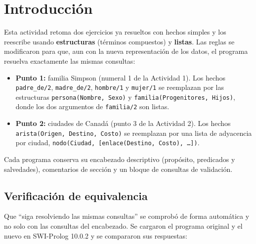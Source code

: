 \documentclass[12pt]{report}
\begin{document}

\tableofcontents
\newpage


\chapter{Introducción}

Esta actividad retoma dos ejercicios ya resueltos con hechos simples y los
reescribe usando \textbf{estructuras} (términos compuestos) y
\textbf{listas}. Las reglas se modificaron para que, aun con la nueva
representación de los datos, el programa resuelva exactamente las mismas
consultas:

\begin{itemize}
    \item \textbf{Punto 1:} familia Simpson (numeral 1 de la Actividad 1).
          Los hechos \texttt{padre\_de/2}, \texttt{madre\_de/2},
          \texttt{hombre/1} y \texttt{mujer/1} se reemplazan por las
          estructuras \texttt{persona(Nombre, Sexo)} y
          \texttt{familia(Progenitores, Hijos)}, donde los dos argumentos de
          \texttt{familia/2} son listas.
    \item \textbf{Punto 2:} ciudades de Canadá (punto 3 de la Actividad 2).
          Los hechos \texttt{arista(Origen, Destino, Costo)} se reemplazan
          por una lista de adyacencia por ciudad,
          \texttt{nodo(Ciudad, [enlace(Destino, Costo), \ldots])}.
\end{itemize}

Cada programa conserva su encabezado descriptivo (propósito, predicados y
salvedades), comentarios de sección y un bloque de consultas de validación.

\section*{Verificación de equivalencia}

Que ``siga resolviendo las mismas consultas'' se comprobó de forma
automática y no solo con las consultas del encabezado. Se cargaron el
programa original y el nuevo en SWI-Prolog 10.0.2 y se compararon sus
respuestas:
\end{document}
